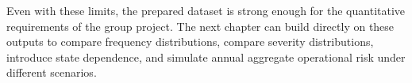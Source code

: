 \documentclass[11pt]{article}
\begin{document}
Even with these limits, the prepared dataset is strong enough for the quantitative requirements of the group project. The next chapter can build directly on these outputs to compare frequency distributions, compare severity distributions, introduce state dependence, and simulate annual aggregate operational risk under different scenarios.
\end{document}
